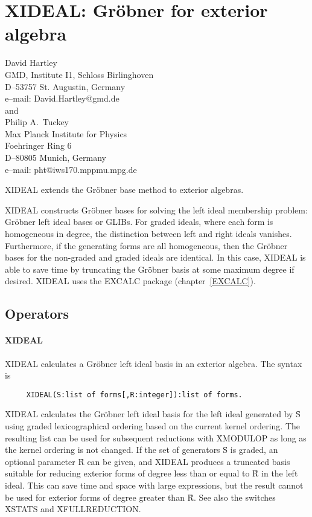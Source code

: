 \chapter{XIDEAL: Gr\"obner for exterior algebra}
\label{XIDEAL}

{\footnotesize
\begin{center}
David Hartley \\
GMD, Institute I1, Schloss Birlinghoven \\
D--53757 St. Augustin, Germany \\[0.05in]
e--mail: David.Hartley@gmd.de \\[0.1in]
and \\
Philip A.~Tuckey \\
Max Planck Institute for Physics \\
Foehringer Ring 6 \\
D--80805 Munich, Germany \\[0.05in]
e--mail: pht@iws170.mppmu.mpg.de
\end{center}
}

XIDEAL extends the Gr\"obner base method to exterior algebras.

XIDEAL constructs Gr\"obner bases for solving the left ideal membership
problem: Gr\"obner left ideal bases or GLIBs. For graded ideals, where each
form is homogeneous in degree, the distinction between left and right
ideals vanishes.  Furthermore, if the generating forms are all homogeneous,
then the Gr\"obner bases for the non-graded and graded ideals are
identical.  In this case, XIDEAL is able to save time by truncating the
Gr\"obner basis at some maximum degree if desired.
XIDEAL uses the EXCALC package (chapter~\ref{EXCALC}).

\section{Operators}

\subsubsection*{XIDEAL}

\f{XIDEAL} calculates a Gr\"obner left ideal basis in
an exterior algebra. The syntax is
\begin{verbatim}
     XIDEAL(S:list of forms[,R:integer]):list of forms.
\end{verbatim}
\f{XIDEAL} calculates the Gr\"obner left ideal basis for the left ideal
generated by \f{S} using graded lexicographical ordering based on the
current kernel ordering.  The resulting list can be used for subsequent
reductions with \f{XMODULOP} as long as the kernel ordering is not
changed.  If the set of generators \f{S} is graded, an optional parameter
\f{R} can be given, and \f{XIDEAL} produces a truncated basis suitable for
reducing exterior forms of degree less than or equal to \f{R} in the left
ideal.  This can save time and space with large expressions, but the result
cannot be used for exterior forms of degree greater than \f{R}.  See also
the switches \f{XSTATS} and \f{XFULLREDUCTION}.



